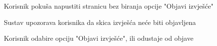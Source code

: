 \begin{packed_item}
\begin{packed_item}
							\item[4.b] Korisnik pokuša napustiti stranicu bez biranja opcije "Objavi izvješće"
							\item[] \begin{packed_enum}
								
								\item Sustav upozorava korisnika da skica izvješća neće biti objavljena
								\item Korisnik odabire opciju "Objavi izvješće", ili odustaje od objave
								
							\end{packed_enum}
							
						\end{packed_item}
						
						
					\end{packed_item}					
					\noindent {}
